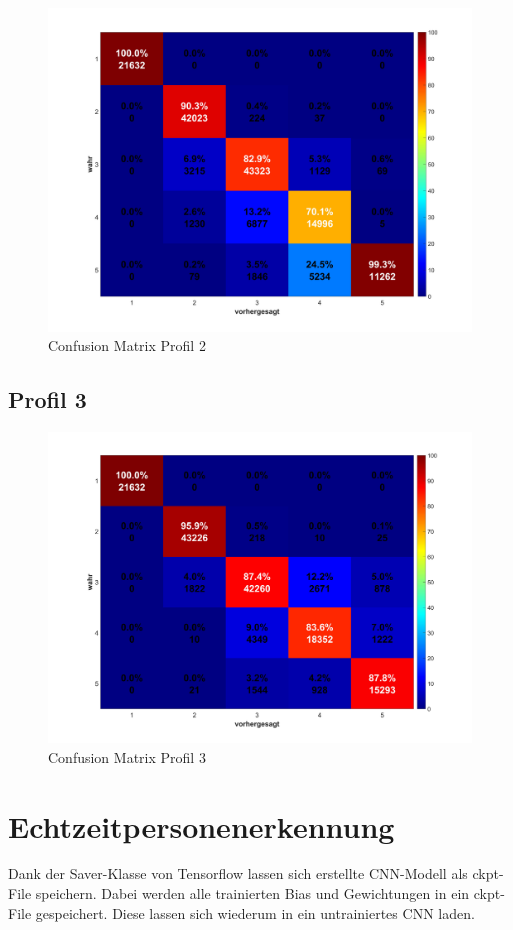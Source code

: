 \begin{figure}[H]
	\centering
	\includegraphics[width=0.7\linewidth]{fig/Profil_2}
	\caption{Confusion Matrix Profil 2}
	\label{fig:profil2}
\end{figure}



\subsection{Profil 3}

\begin{figure}[H]
	\centering
	\includegraphics[width=0.7\linewidth]{fig/Profil_3}
		\caption{Confusion Matrix Profil 3}
	\label{fig:profil3}
\end{figure}

\section{Echtzeitpersonenerkennung}

Dank der Saver-Klasse von Tensorflow lassen sich erstellte \ac{CNN}-Modell als ckpt-File speichern. Dabei werden alle trainierten Bias und Gewichtungen in ein ckpt-File gespeichert. Diese lassen sich wiederum in ein untrainiertes CNN laden.

